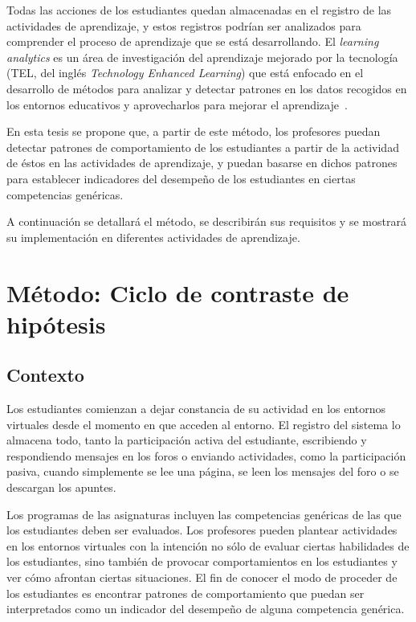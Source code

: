 Todas las acciones de los estudiantes quedan almacenadas en el registro de las actividades de aprendizaje, y estos registros podrían ser analizados para comprender el proceso de aprendizaje que se está desarrollando. El \emph{learning analytics} es un área de investigación del aprendizaje mejorado por la tecnología (TEL, del inglés \emph{Technology Enhanced Learning}) que está enfocado en el desarrollo de métodos para analizar y detectar patrones en los datos recogidos en los entornos educativos y aprovecharlos para mejorar el aprendizaje~\cite{chatti2014learning}.

En esta tesis se propone que, a partir de este método, los profesores puedan detectar patrones de comportamiento de los estudiantes a partir de la actividad de éstos en las actividades de aprendizaje, y puedan basarse en dichos patrones para establecer indicadores del desempeño de los estudiantes en ciertas competencias genéricas. 

A continuación se detallará el método, se describirán sus requisitos y se mostrará su implementación en diferentes actividades de aprendizaje.



\section{Método: Ciclo de contraste de hipótesis}

\subsection{Contexto}

Los estudiantes comienzan a dejar constancia de su actividad en los entornos virtuales desde el momento en que acceden al entorno. El registro del sistema lo almacena todo, tanto la participación activa del estudiante, escribiendo y respondiendo mensajes en los foros o enviando actividades, como la participación pasiva, cuando simplemente se lee una página, se leen los mensajes del foro o se descargan los apuntes. 

Los programas de las asignaturas incluyen las competencias genéricas de las que los estudiantes deben ser evaluados. Los profesores pueden plantear actividades en los entornos virtuales con la intención no sólo de evaluar ciertas habilidades de los estudiantes, sino también de provocar comportamientos en los estudiantes y ver cómo afrontan ciertas situaciones. El fin de conocer el modo de proceder de los estudiantes es encontrar patrones de comportamiento que puedan ser interpretados como un indicador del desempeño de alguna competencia genérica.

